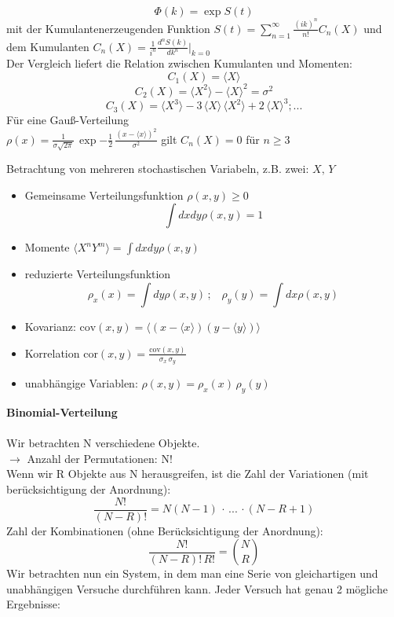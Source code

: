 \documentclass[a4paper,11pt]{scrartcl}
\begin{document}
$$\Phi (k) = \exp{S(t)}$$
mit der Kumulantenerzeugenden Funktion $ S(t) = \sum_{n=1}^{\infty} \frac{(ik)^n}{n!} C_n(X)$ und dem Kumulanten $C_n(X) = \frac{1}{i^n} \frac{d^n S(k)}{dk^n} \Biggl|_{k=0}$\\
Der Vergleich liefert die Relation zwischen Kumulanten und Momenten:\\
$$C_1(X) = \langle X \rangle $$
$$ C_2(X) = \langle X^2 \rangle - \langle X \rangle^2 = \sigma^2 $$
$$ C_3(X) = \langle X^3 \rangle - 3 \, \langle X \rangle \, \langle X^2 \rangle + 2 \, \langle X \rangle^3; ... $$
Für eine Gauß-Verteilung \\
$\rho(x) = \frac{1}{ \sigma \sqrt{2 \pi} } \, \exp{-\frac{1}{2} \, \frac{(x- \langle x \rangle )^2}{\sigma^2}} $ gilt $C_n(X) = 0$ für $n \geq 3 $

Betrachtung von mehreren stochastischen Variabeln, z.B. zwei: $X, \,Y$\\
\begin{itemize}
 \item Gemeinsame Verteilungsfunktion $\rho (x,y) \geq 0 $ \\
 $$ \int dx dy \rho (x,y) = 1 $$
 \item Momente $\langle X^n Y^m \rangle = \int dx dy \rho (x,y)$
 \item reduzierte Verteilungsfunktion $$ \rho_x (x) = \int dy \rho (x,y)\, ; \,\,\,\,\, \rho_y(y) = \int dx \rho(x,y)$$
 \item Kovarianz: $\mathrm{cov}(x,y) = \langle (x-\langle x \rangle ) (y- \langle y \rangle ) \rangle $
 \item Korrelation $ \mathrm{cor}(x,y) = \frac{ \mathrm{cov}(x,y)}{\sigma_x \, \sigma_y}$
 \item unabhängige Variablen: $\rho(x,y) = \rho_x(x) \, \rho_y(y)$
\end{itemize}
\textbf{Binomial-Verteilung}\\
\\
Wir betrachten N verschiedene Objekte.\\
$ \rightarrow$ Anzahl der Permutationen: N!\\
Wenn wir R Objekte aus N herausgreifen, ist die Zahl der Variationen (mit berücksichtigung der Anordnung): $$ \frac{N!}{(N-R)!} = N(N-1) \, \cdot \, ... \, \cdot (N-R+1)$$
Zahl der Kombinationen (ohne Berücksichtigung der Anordnung): $$ \frac{N!}{(N-R)!\, R!} = \binom{N}{R}$$
Wir betrachten nun ein System, in dem man eine Serie von gleichartigen und unabhängigen Versuche durchführen kann. Jeder Versuch hat genau 2 mögliche Ergebnisse:\\
\end{document}
